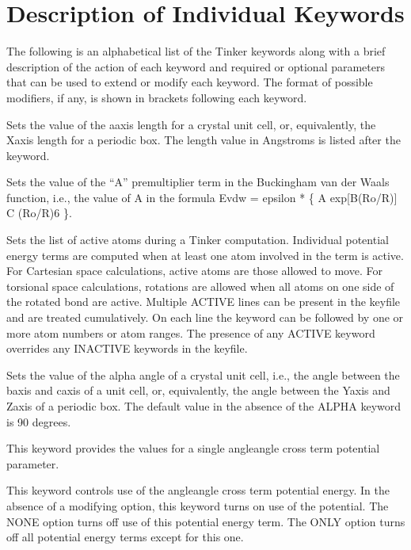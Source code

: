 \documentclass[letterpaper,11pt,english]{sphinxmanual}
\begin{document}
\section{Description of Individual Keywords}
\label{\detokenize{text/keywords:description-of-individual-keywords}}
The following is an alphabetical list of the Tinker keywords along with a brief description of the action of each keyword and required or optional parameters that can be used to extend or modify each keyword. The format of possible modifiers, if any, is shown in brackets following each keyword.

  Sets the value of the a\sphinxhyphen{}axis length for a crystal unit cell, or, equivalently, the X\sphinxhyphen{}axis length for a periodic box. The length value in Angstroms is listed after the keyword.

  Sets the value of the “A” premultiplier term in the Buckingham van der Waals function, i.e., the value of A in the formula Evdw = epsilon * \{ A exp{[}\sphinxhyphen{}B(Ro/R){]} \sphinxhyphen{} C (Ro/R)6 \}.

  Sets the list of active atoms during a Tinker computation. Individual potential energy terms are computed when at least one atom involved in the term is active. For Cartesian space calculations, active atoms are those allowed to move. For torsional space calculations, rotations are allowed when all atoms on one side of the rotated bond are active. Multiple ACTIVE lines can be present in the keyfile and are treated cumulatively.  On each line the keyword can be followed by one or more atom numbers or atom ranges. The presence of any ACTIVE keyword overrides any INACTIVE keywords in the keyfile.

  Sets the value of the alpha angle of a crystal unit cell, i.e., the angle between the b\sphinxhyphen{}axis and c\sphinxhyphen{}axis of a unit cell, or, equivalently, the angle between the Y\sphinxhyphen{}axis and Z\sphinxhyphen{}axis of a periodic box. The default value in the absence of the ALPHA keyword is 90 degrees.

  This keyword provides the values for a single angle\sphinxhyphen{}angle cross term potential parameter.

  This keyword controls use of the angle\sphinxhyphen{}angle cross term potential energy. In the absence of a modifying option, this keyword turns on use of the potential. The NONE option turns off use of this potential energy term. The ONLY option turns off all potential energy terms except for this one.
\end{document}
